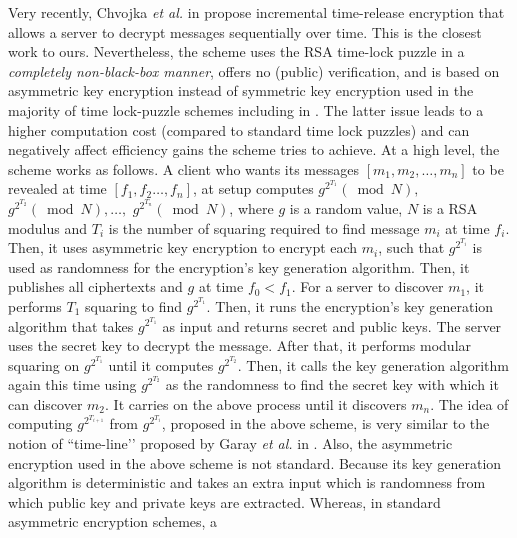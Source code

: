 Very recently, Chvojka \textit{et al.} in \cite{ChvojkaJSS20} propose  incremental time-release encryption that allows a server to decrypt messages sequentially over time. This is the closest work to ours. Nevertheless, the scheme uses the RSA time-lock puzzle \cite{Rivest:1996:TPT:888615} in a \emph{completely non-black-box manner}, offers no (public) verification, and is based on  asymmetric key encryption instead of symmetric key encryption used in the majority of time lock-puzzle schemes including in \cite{Rivest:1996:TPT:888615}. The latter issue leads to a higher computation cost (compared to standard time lock puzzles) and can negatively affect  efficiency gains the scheme tries to achieve.  At a high level, the scheme works as follows. A client who wants its messages $[m_{\scriptscriptstyle 1},m_{\scriptscriptstyle 2},…, m_{\scriptscriptstyle n}]$ to be revealed at time $[f_{\scriptscriptstyle 1}, f_{\scriptscriptstyle 2}…, f_{\scriptscriptstyle n}]$, at setup computes $g^{\scriptscriptstyle 2^{\scriptscriptstyle T_{\scriptscriptstyle 1}}} (\bmod N),$  $g^{\scriptscriptstyle 2^{\scriptscriptstyle T_{\scriptscriptstyle 2}}}(\bmod N),…,$  $g^{\scriptscriptstyle 2^{\scriptscriptstyle T_{\scriptscriptstyle n}}}(\bmod N)$, where $g$ is a random value, $N$ is a RSA modulus and  $T_{\scriptscriptstyle i}$ is the number of squaring required to find message $m_{\scriptscriptstyle i}$ at time $f_{\scriptscriptstyle i}$. Then, it uses  asymmetric key encryption to encrypt each $m_{\scriptscriptstyle i}$, such that $g^{\scriptscriptstyle 2^{\scriptscriptstyle T_{\scriptscriptstyle i}}}$ is used as  randomness for the encryption’s key generation algorithm. Then, it publishes all ciphertexts and $g$ at time $f_{\scriptscriptstyle 0}<f_{\scriptscriptstyle 1}$. For a server to discover $m_{\scriptscriptstyle 1}$, it performs $T_{\scriptscriptstyle 1}$ squaring to find $g^{\scriptscriptstyle 2^{\scriptscriptstyle T_{\scriptscriptstyle 1}}}$. Then, it runs the encryption’s key generation algorithm that takes $g^{\scriptscriptstyle 2^{\scriptscriptstyle T_{\scriptscriptstyle 1}}}$ as input and returns secret and public keys. The server uses the secret key to decrypt the message. After that, it performs modular squaring on $g^{\scriptscriptstyle 2^{\scriptscriptstyle T_{\scriptscriptstyle 1}}}$ until it computes $g^{\scriptscriptstyle 2^{\scriptscriptstyle T_{\scriptscriptstyle 2}}}$. Then, it calls the key generation algorithm again this time using $g^{\scriptscriptstyle 2^{\scriptscriptstyle T_{\scriptscriptstyle 2}}}$ as the randomness to find the secret key with which it can discover $m_{\scriptscriptstyle 2}$. It carries on the above process until it discovers $m_{\scriptscriptstyle n}$. The idea of computing $g^{\scriptscriptstyle 2^{\scriptscriptstyle T_{\scriptscriptstyle i+1}}}$ from $g^{\scriptscriptstyle 2^{\scriptscriptstyle T_{\scriptscriptstyle i}}}$, proposed in the above scheme,  is very similar to the notion of ``time-line’’ proposed by Garay \textit{et al.} in \cite{DBLP:conf/fc/GarayJ02}. Also, the asymmetric encryption used in the above scheme is not standard. Because its key generation algorithm is  deterministic and  takes an extra input which is randomness from which public key and private keys are extracted. Whereas, in standard asymmetric encryption schemes, a 